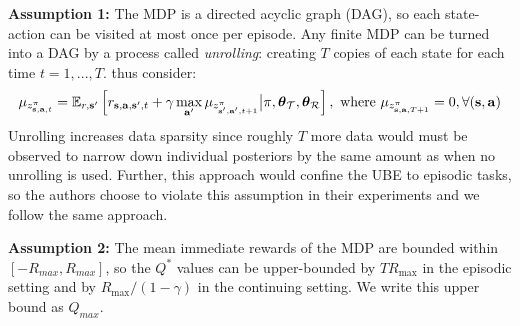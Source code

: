 \documentclass{article}
\begin{document}
\begin{appendices}
\textbf{Assumption 1:} The MDP is a directed acyclic graph (DAG), so each state-action can be visited at most once per episode. Any finite MDP can be turned into a DAG by a process called \textit{unrolling}: creating $T$ copies of each state for each time $t = 1, ..., T$. \cite{ube} thus consider:
\begin{align} \label{app:eq:bet}
\mu_{z^\pi_{\mathbf{s}, \mathbf{a}, t}} = \operatorname{\mathbb{E}}_{r, \mathbf{s}'}\left[ r_{\mathbf{s}, \mathbf{a}, \mathbf{s}', t} + \gamma \max_{\mathbf{a}'}  \mu_{z^\pi_{\mathbf{s}', \mathbf{a}', t + 1}} \big| \pi, \boldsymbol{\theta}_{\mathcal{T}}, \boldsymbol{\theta}_{\mathcal{R}} \right], \text{ where } \mu_{z^\pi_{\mathbf{s}, \mathbf{a}, T + 1}} = 0, \forall (\mathbf{s}, \mathbf{a})
\end{align}
Unrolling increases data sparsity since roughly $T$ more data would must be observed to narrow down individual posteriors by the same amount as when no unrolling is used. Further, this approach would confine the UBE to episodic tasks, so the authors choose to violate this assumption in their experiments and we follow the same approach.

\textbf{Assumption 2:} The mean immediate rewards of the MDP are bounded within $[-R_{max}, R_{max}]$, so the $Q^*$ values can be upper-bounded by $T R_{\max}$ in the episodic setting and by $R_{\max} / (1 - \gamma)$ in the continuing setting. We write this upper bound as $Q_{max}$.



\end{appendices}
\end{document}
